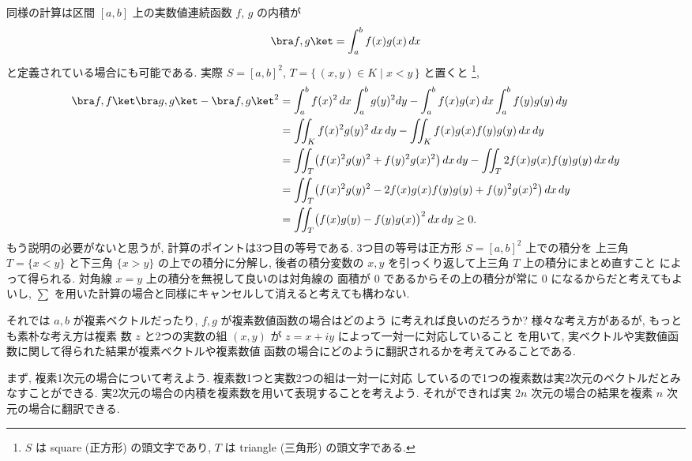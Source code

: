 \documentclass[12pt,twoside]{jarticle}
\begin{document}
同様の計算は区間 $[a,b]$ 上の実数値連続函数 $f$, $g$ の内積が
\begin{equation*}
  \bra f, g\ket = \int_a^b f(x)g(x)\,dx
\end{equation*}
と定義されている場合にも可能である.
実際 $S=[a,b]^2$, $T = \{\,(x,y)\in K\mid x<y\,\}$ と置くと%
\footnote{$S$ は square (正方形) の頭文字であり, $T$ は triangle 
  (三角形) の頭文字である.},
{\small
\begin{align*}
  \bra f,f\ket \bra g,g\ket - \bra f,g\ket^2
  &
  = \int_a^b f(x)^2\,dx \int_a^b g(y)^2dy 
  - \int_a^b f(x)g(x)\,dx \int_a^b f(y)g(y)\,dy
  \\ &
  = \iint_K f(x)^2g(y)^2\,dx\,dy
  - \iint_K f(x)g(x)f(y)g(y)\,dx\,dy 
  \\ &
  = \iint_T \bigl(f(x)^2g(y)^2 + f(y)^2g(x)^2\bigr) \,dx\,dy
  - \iint_T 2f(x)g(x)f(y)g(y)\,dx\,dy
  \\ &
  = \iint_T \bigl(
      f(x)^2g(y)^2 - 2f(x)g(x)f(y)g(y) + f(y)^2g(x)^2
    \bigr) \,dx\,dy
  \\ &
  = \iint_T \bigl(f(x)g(y) - f(y)g(x)\bigr)^2 \,dx\,dy
  \ge 0.
\end{align*}
}もう説明の必要がないと思うが, 計算のポイントは3つ目の等号である.
3つ目の等号は正方形 $S=[a,b]^2$ 上での積分を
上三角 $T=\{x<y\}$ と下三角 $\{x>y\}$ の上での積分に分解し, 
後者の積分変数の $x,y$ を引っくり返して上三角 $T$ 上の積分にまとめ直すこと
によって得られる.  対角線 $x=y$ 上の積分を無視して良いのは対角線の
面積が $0$ であるからその上の積分が常に $0$ になるからだと考えてもよいし,
$\sum$ を用いた計算の場合と同様にキャンセルして消えると考えても構わない.

それでは $a,b$ が複素ベクトルだったり, $f,g$ が複素数値函数の場合はどのよう
に考えれば良いのだろうか?  様々な考え方があるが, もっとも素朴な考え方は複素
数 $z$ と2つの実数の組 $(x,y)$ が $z=x+iy$ によって一対一に対応していること
を用いて, 実ベクトルや実数値函数に関して得られた結果が複素ベクトルや複素数値
函数の場合にどのように翻訳されるかを考えてみることである.

まず, 複素1次元の場合について考えよう. 複素数1つと実数2つの組は一対一に対応
しているので1つの複素数は実2次元のベクトルだとみなすことができる.  
実2次元の場合の内積を複素数を用いて表現することを考えよう.
それができれば実 $2n$ 次元の場合の結果を複素 $n$ 次元の場合に翻訳できる.
\end{document}
